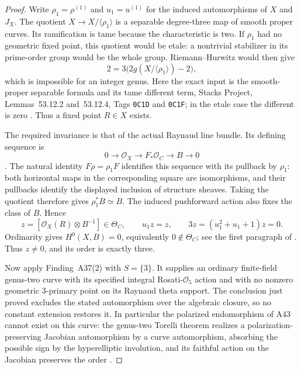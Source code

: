 \begin{proof}
Write $\rho_1=\rho^{(1)}$ and $u_1=u^{(1)}$ for the induced
automorphisms of $X$ and $J_X$.  The quotient
$X\to X/\langle\rho_1\rangle$ is a separable degree-three map
of smooth proper curves.  Its ramification is tame because the
characteristic is two.  If $\rho_1$ had no geometric fixed point,
this quotient would be etale: a nontrivial stabilizer in its
prime-order group would be the whole group.  Riemann--Hurwitz
would then give
\[
                    2=3\bigl(2g(X/\langle\rho_1\rangle)-2\bigr),
\]
which is impossible for an integer genus.  Here the exact input is
the smooth-proper separable formula and its tame different term,
Stacks Project, Lemmas~53.12.2 and~53.12.4, Tags
\texttt{0C1D} and \texttt{0C1F}; in the etale case the different
is zero \cite{StacksRH}.  Thus a fixed point $R\in X$ exists.

The required invariance is that of the actual Raynaud line bundle.
Its defining sequence is
\[
 0\longrightarrow\mathcal O_X\longrightarrow F_*\mathcal O_C
                     \longrightarrow B\longrightarrow0
\]
\cite[Section~8.1, p.~472]{OzmanPries2019}.
The natural identity $F\rho=\rho_1F$ identifies this sequence
with its pullback by $\rho_1$: both horizontal maps in the
corresponding square are isomorphisms, and their pullbacks
identify the displayed inclusion of structure sheaves.
Taking the quotient therefore gives $\rho_1^*B\simeq B$.
The induced pushforward action also fixes the class of $B$.
Hence
\[
 z=[\mathcal O_X(R)\otimes B^{-1}]
     \in\Theta_C,\qquad u_1z=z,
     \qquad 3z=(u_1^2+u_1+1)z=0.
\]
Ordinarity gives $H^0(X,B)=0$, equivalently
$0\notin\Theta_C$; see the first paragraph of
\cite[Section~8.2, p.~472]{OzmanPries2019}.
Thus $z\ne0$, and its order is exactly three.

Now apply Finding~A37(2) with $S=\{3\}$.
It supplies an ordinary finite-field genus-two curve with its
specified integral Rosati-$\mathcal O_5$ action and with no
nonzero geometric $3$-primary point on its Raynaud theta support.
The conclusion just proved excludes the stated automorphism
over the algebraic closure, so no constant extension restores it.
In particular the polarized endomorphism of A43 cannot exist on
this curve: the genus-two Torelli theorem realizes a
polarization-preserving Jacobian automorphism by a curve
automorphism, absorbing the possible sign by the hyperelliptic
involution, and its faithful action on the Jacobian preserves
the order \cite[Theorem~12.1]{MilneJV}.
\end{proof}

